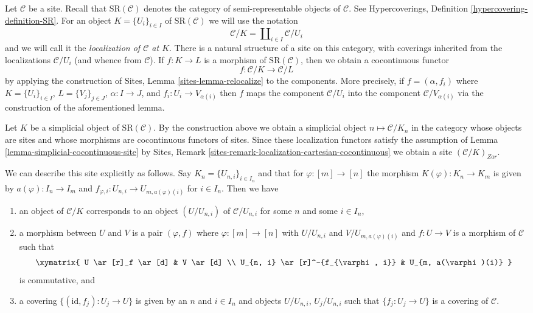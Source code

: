 \noindent
Let $\mathcal{C}$ be a site. Recall that $\text{SR}(\mathcal{C})$
denotes the category of semi-representable objects of $\mathcal{C}$.
See Hypercoverings, Definition \ref{hypercovering-definition-SR}.
For an object $K = \{U_i\}_{i \in I}$ of $\text{SR}(\mathcal{C})$
we will use the notation
$$
\mathcal{C}/K = \coprod\nolimits_{i \in I} \mathcal{C}/U_i
$$
and we will call it the {\it localization of $\mathcal{C}$ at $K$}.
There is a natural structure of a site on this category, with
coverings inherited from the localizations $\mathcal{C}/U_i$
(and whence from $\mathcal{C}$). If $f : K \to L$ is a morphism of
$\text{SR}(\mathcal{C})$, then we obtain a cocontinuous functor
$$
f : \mathcal{C}/K \longrightarrow \mathcal{C}/L
$$
by applying the construction of Sites, Lemma \ref{sites-lemma-relocalize}
to the components. More precisely, if $f = (\alpha, f_i)$
where $K = \{U_i\}_{i \in I}$, $L = \{V_j\}_{j \in J}$, $\alpha : I \to J$,
and $f_i : U_i \to V_{\alpha(i)}$ then $f$ maps the component
$\mathcal{C}/U_i$ into the component $\mathcal{C}/V_{\alpha(i)}$
via the construction of the aforementioned lemma.
 
\medskip\noindent
Let $K$ be a simplicial object of $\text{SR}(\mathcal{C})$.
By the construction above we obtain a simplicial object
$n \mapsto \mathcal{C}/K_n$ in the category
whose objects are sites and whose morphisms are cocontinuous
functors of sites. Since these localization functors satisfy the assumption
of Lemma \ref{lemma-simplicial-cocontinuous-site} by
Sites, Remark \ref{sites-remark-localization-cartesian-cocontinuous}
we obtain a site $(\mathcal{C}/K)_{Zar}$.

\medskip\noindent
We can describe this site explicitly as follows. Say
$K_n = \{U_{n, i}\}_{i \in I_n}$ and that for $\varphi : [m] \to [n]$
the morphism $K(\varphi) : K_n \to K_m$ is given by
$a(\varphi) : I_n \to I_m$ and
$f_{\varphi, i} : U_{n, i} \to U_{m, a(\varphi)(i)}$ for $i \in I_n$.
Then we have
\begin{enumerate}
\item an object of $\mathcal{C}/K$ corresponds to an object $(U/U_{n, i})$
of $\mathcal{C}/U_{n, i}$ for some $n$ and some $i \in I_n$,
\item a morphism between $U$ and $V$ is a pair $(\varphi, f)$
where $\varphi : [m] \to [n]$ with $U/U_{n, i}$ and
$V/U_{m, a(\varphi)(i)}$ and $f : U \to V$ is a morphism of $\mathcal{C}$
such that
$$
\xymatrix{
U \ar[r]_f \ar[d] & V \ar[d] \\
U_{n, i} \ar[r]^-{f_{\varphi, i}} & U_{m, a(\varphi)(i)}
}
$$
is commutative, and
\item a covering $\{(\text{id}, f_j) : U_j \to U\}$ is given by
an $n$ and $i \in I_n$ and objects $U/U_{n, i}$, $U_j/U_{n, i}$
such that $\{f_j  : U_j \to U\}$ is a covering of $\mathcal{C}$.
\end{enumerate}

